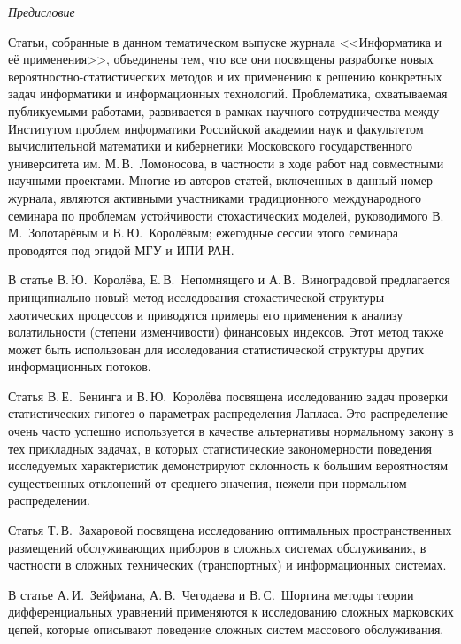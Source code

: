 { %
{ %

\vspace*{-48pt}
\begin{center}\LARGE
\textit{Предисловие}
\end{center}

\thispagestyle{empty}

\hspace*{5mm}Статьи, собранные в данном тематическом выпуске журнала <<Информатика и её применения>>,
объединены тем, что все они посвящены разработке новых вероятностно-статистических методов и их
применению к решению конкретных задач информатики и информационных технологий. Проблематика,
охватываемая публикуемыми работами, развивается в рамках научного сотрудничества между Институтом
проблем информатики Российской академии наук и факультетом вычислительной математики и
кибернетики Московского государственного университета им. М.\,В.~Ломоносова, в частности в ходе работ
над совместными научными проектами. Многие из авторов статей, включенных в данный номер журнала,
являются активными участниками традиционного международного семинара по проблемам устойчивости
стохастических моделей, руководимого В.\,М.~Золотарёвым и В.\,Ю.~Королёвым; ежегодные сессии этого
семинара проводятся под эгидой МГУ и ИПИ РАН.

       В статье В.\,Ю.~Королёва, Е.\,В.~Непомнящего и А.\,В.~Виноградовой предлагается
принципиально новый метод исследования стохастической структуры хаотических процессов и приводятся
примеры его применения к анализу волатильности (степени изменчивости) финансовых индексов. Этот
метод также может быть использован для исследования статистической структуры других информационных
потоков.

       Статья В.\,Е.~Бенинга и В.\,Ю.~Королёва посвящена исследованию задач проверки статистических
гипотез о параметрах распределения Лапласа. Это распределение очень часто успешно используется в
качестве альтернативы нормальному закону в тех прикладных задачах, в которых статистические
закономерности поведения исследуемых характеристик демонстрируют склонность к большим
вероятностям существенных отклонений от среднего значения, нежели при нормальном распределении.

       Статья Т.\,В.~Захаровой посвящена исследованию оптимальных пространственных размещений
обслуживающих приборов в сложных системах обслуживания, в частности в сложных технических
(транспортных) и информационных системах.

       В статье А.\,И.~Зейфмана, А.\,В.~Чегодаева и В.\,С.~Шоргина методы теории дифференциальных
уравнений применяются к исследованию сложных марковских цепей, которые описывают поведение
сложных систем массового обслуживания.

}}

